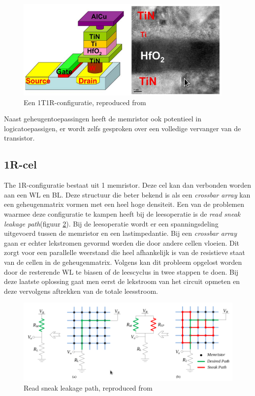 \begin{figure}
  \centering
  \includegraphics[scale=0.6]{../fig/hfdstk-cel-1T1R.png}
  \caption[Een 1T1R-configuratie]{Een 1T1R-configuratie, reproduced from\cite{Won12}}
  \label{fig:1T1R}
\end{figure}

Naast geheugentoepassingen heeft de memristor ook potentieel in logicatoepassigen, er wordt zelfs gesproken over een volledige vervanger van de transistor\cite{Kue05}.
\subsection{1R-cel}
\label{1R}
The 1R-configuratie bestaat uit 1 memristor. Deze cel kan dan verbonden worden aan een WL en BL. Deze structuur die beter bekend is als een \textit{crossbar array} kan een geheugenmatrix vormen met een heel hoge densiteit. Een van de problemen waarmee deze configuratie te kampen heeft bij de leesoperatie is de \textit{read sneak leakage path}\cite{leakpath}(figuur \ref{fig:leak}). Bij de leesoperatie wordt er een spanningsdeling uitgevoerd tussen de memristor en een lastimpedantie. Bij een \textit{crossbar array} gaan er echter lekstromen gevormd worden die door andere cellen vloeien. Dit zorgt voor een parallelle weerstand die heel afhankelijk is van de resistieve staat van de cellen in de geheugenmatrix. Volgens \cite{5763125} kan dit probleem opgelost worden door de resterende WL te biasen of de leescyclus in twee stappen te doen. Bij deze laatste oplossing gaat men eerst de lekstroom van het circuit opmeten en deze vervolgens aftrekken van de totale leesstroom.

\begin{figure}
  \centering
  \includegraphics[width=\textwidth]{../fig/hfdstk-cel-1Rleak.png}
  \caption[Read sneak leakage path]{Read sneak leakage path, reproduced from\cite{leakpath}}
  \label{fig:leak}
\end{figure}

